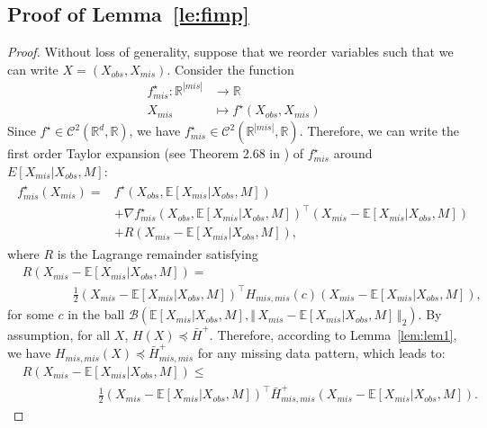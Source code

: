 \documentclass{article}
\newcommand{\RR}{\mathbb{R}}
\newcommand{\E}{\mathbb{E}}
\newcommand{\Bcal}{\mathcal{B}}
\newcommand{\Ccal}{\mathcal{C}}
\newcommand{\br}[1]{\left(#1\right)}
\newcommand{\sqb}[1]{\left[#1\right]}
\newcommand{\nm}[1]{\left\Vert\, #1 \,\right\Vert}
\theoremstyle{plain}
\begin{document}
\subsection{Proof of Lemma~\ref{le:fimp}}
\label{ss:proof_fimp}

\fimpth*

\begin{proof}
Without loss of generality, suppose that we reorder variables such that we can write $X = (X_{obs}, X_{mis})$. Consider the function
\begin{align*}
    f^\star_{mis}: \RR^{|mis|} & \to \RR\\
    X_{mis} &\mapsto f^\star(X_{obs}, X_{mis})
\end{align*}
Since $f^\star \in \Ccal^2\br{\RR^d, \RR}$, we have $f^\star_{mis} \in \Ccal^2 \br{\RR^{|mis|}, \RR}$. Therefore, we can write the first order Taylor expansion (see Theorem 2.68 in \cite{Folland2002advanced}) of $f^\star_{mis}$ around $E\sqb{X_{mis}|X_{obs}, M}$:
    \begin{align}
        \begin{split}
            \label{eq:Taylor}
            f^\star_{mis}(X_{mis}) =& f^\star(X_{obs}, \E\sqb{X_{mis}|X_{obs}, M})\\
            & + \nabla f^\star_{mis}(X_{obs}, \E\sqb{X_{mis}|X_{obs}, M})^\top \br{X_{mis} - \E\sqb{X_{mis}|X_{obs}, M}}\\
            & + R\br{X_{mis} - \E\sqb{X_{mis}|X_{obs}, M}},
        \end{split}
    \end{align}
    where $R$ is the Lagrange remainder satisfying
    \begin{align*}
        & R\br{X_{mis} - \E\sqb{X_{mis}| X_{obs}, M}} = \\
        & \hspace{4em} \frac{1}{2}\br{X_{mis} - \E\sqb{X_{mis}|X_{obs}, M}}^\top H_{mis, mis}(c) \br{X_{mis} - \E\sqb{X_{mis}|X_{obs}, M}},
    \end{align*}
    for some $c$ in the ball $\Bcal\br{\E\sqb{X_{mis}|X_{obs}, M}, \nm{X_{mis} - \E\sqb{X_{mis}|X_{obs}, M}}_2}$. By assumption, for all $X$, $H(X) \preccurlyeq \bar{H}^+$. Therefore, according to Lemma~\ref{lem:lem1},  we have $H_{mis, mis}(X) \preccurlyeq \bar{H}^+_{mis, mis}$ for any missing data pattern, which leads to:
    \begin{align*}
        & R\br{X_{mis} - \E\sqb{X_{mis}|X_{obs}, M}} \leq\\
        & \hspace{6em} \frac{1}{2}\br{X_{mis} - \E\sqb{X_{mis}|X_{obs}, M}}^\top \bar H^+_{mis, mis} \br{X_{mis} - \E\sqb{X_{mis}|X_{obs}, M}}.

\end{align*}
\end{proof}
\end{document}
